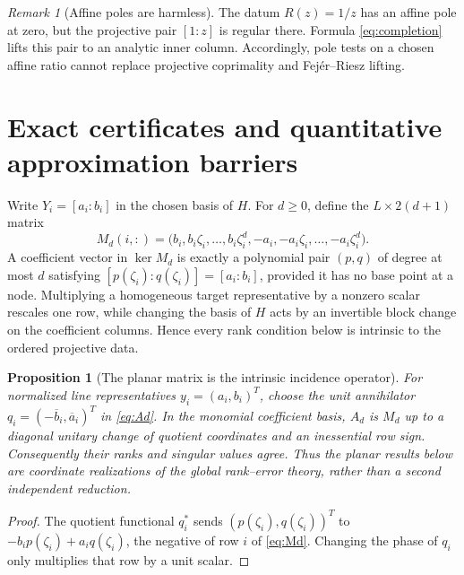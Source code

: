 \documentclass[11pt]{article}
\newtheorem{proposition}[theorem]{Proposition}
\theoremstyle{definition}\newtheorem{definition}[theorem]{Definition}\newtheorem{example}[theorem]{Example}
\theoremstyle{remark}\newtheorem{remark}[theorem]{Remark}\newtheorem{limitation}[theorem]{Limitation}
\begin{document}
\begin{remark}[Affine poles are harmless]
The datum $R(z)=1/z$ has an affine pole at zero, but the projective pair $[1:z]$
is regular there.  Formula \eqref{eq:completion} lifts this pair to an analytic
inner column.  Accordingly, pole tests on a chosen affine ratio cannot replace
projective coprimality and Fej\'er--Riesz lifting.
\end{remark}

\section{Exact certificates and quantitative approximation barriers}

Write $Y_i=[a_i:b_i]$ in the chosen basis of $H$.  For $d\ge0$, define the
$L\times2(d+1)$ matrix
\begin{equation}\label{eq:Md}
 M_d(i,:)=
 \bigl(b_i,b_i\zeta_i,\ldots,b_i\zeta_i^d,
       -a_i,-a_i\zeta_i,\ldots,-a_i\zeta_i^d\bigr).
\end{equation}
A coefficient vector in $\ker M_d$ is exactly a polynomial pair $(p,q)$ of
degree at most $d$ satisfying $[p(\zeta_i):q(\zeta_i)]=[a_i:b_i]$, provided it
has no base point at a node.
Multiplying a homogeneous target representative by a nonzero scalar rescales
one row, while changing the basis of $H$ acts by an invertible block change on
the coefficient columns.  Hence every rank condition below is intrinsic to the
ordered projective data.

\begin{proposition}[The planar matrix is the intrinsic incidence operator]
\label{prop:A-equals-M}
For normalized line representatives $y_i=(a_i,b_i)^T$, choose the unit
annihilator $q_i=(-\overline b_i,\overline a_i)^T$ in
\eqref{eq:Ad}.  In the monomial coefficient basis, $A_d$ is $M_d$ up to a
diagonal unitary change of quotient coordinates and an inessential row sign.
Consequently their ranks and singular values agree.  Thus the planar results
below are coordinate realizations of the global rank--error theory, rather
than a second independent reduction.
\end{proposition}

\begin{proof}
The quotient functional $q_i^*$ sends $(p(\zeta_i),q(\zeta_i))^T$ to
$-b_ip(\zeta_i)+a_iq(\zeta_i)$, the negative of row $i$ of
\eqref{eq:Md}.  Changing the phase of $q_i$ only multiplies that row by a
unit scalar.
\end{proof}
\end{document}
